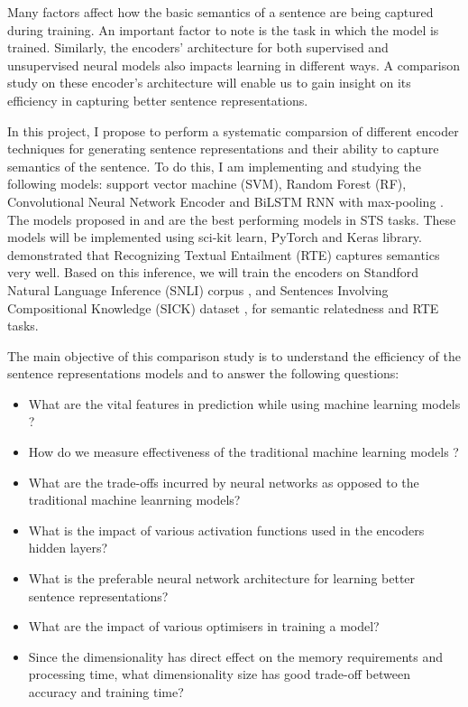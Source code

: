 \documentclass[12pt]{report} %
\begin{document}
Many factors affect how the basic semantics of a sentence are being captured during training. An important factor to note is the task in which the model is trained. Similarly, the encoders' architecture for both supervised and unsupervised neural models also impacts learning in different ways. A comparison study on these encoder's architecture will enable us to gain insight on its efficiency in capturing better sentence representations.


In this project, I propose to perform  a systematic comparsion of different encoder techniques for generating sentence representations and their ability to capture semantics of the sentence. To do this, I am implementing and studying the following models: support vector machine (SVM), Random Forest (RF), Convolutional Neural Network Encoder \citep{shao2017hcti} and BiLSTM RNN with max-pooling \citep{conneau2017supervised}. The models proposed in \cite{shao2017hcti} and \cite{conneau2017supervised} are the best performing models in STS tasks. These models will be implemented using sci-kit learn, PyTorch and Keras library. \cite{conneau2017supervised} demonstrated that Recognizing Textual Entailment (RTE) captures semantics very well. Based on this inference, we will train the  encoders on Standford Natural Language Inference (SNLI) corpus  \citep{bowman2015large}, and Sentences Involving Compositional
Knowledge (SICK) dataset \citep{marelli2014semeval}, for semantic relatedness and RTE tasks.

The main objective of this comparison study is to understand the efficiency of the sentence representations models and to answer the following questions:

\begin{itemize}
	\item What are the vital features in prediction while using machine learning models ?
	\item How do we measure effectiveness of the traditional machine learning models ?
	\item What are the trade-offs incurred by neural networks as opposed to the traditional machine leanrning models?
	\item What is the impact of various activation functions used in the encoders hidden layers?
	\item What is the preferable neural network architecture for learning better sentence representations? 
	\item What are the impact of various optimisers in training a model?
	\item Since the dimensionality has direct effect on the memory requirements and processing time, what dimensionality size has good trade-off between accuracy and training time? 
\end{itemize}
 
\end{document}
